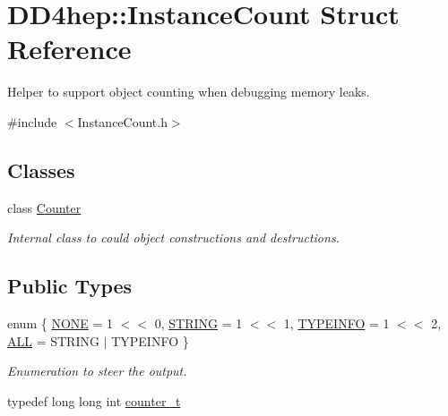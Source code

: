 \hypertarget{struct_d_d4hep_1_1_instance_count}{}\section{D\+D4hep\+:\+:Instance\+Count Struct Reference}
\label{struct_d_d4hep_1_1_instance_count}


Helper to support object counting when debugging memory leaks.  




{\ttfamily \#include $<$Instance\+Count.\+h$>$}

\subsection*{Classes}
\begin{DoxyCompactItemize}
\item 
class \hyperlink{class_d_d4hep_1_1_instance_count_1_1_counter}{Counter}
\begin{DoxyCompactList}\small\item\em Internal class to could object constructions and destructions. \end{DoxyCompactList}\end{DoxyCompactItemize}
\subsection*{Public Types}
\begin{DoxyCompactItemize}
\item 
enum \{ \hyperlink{struct_d_d4hep_1_1_instance_count_ae1ac289e30ac5ae83640ae2ed97f947ca7ef09dfc0136f6756ab56b221b86115a}{N\+O\+NE} = 1 $<$$<$ 0, 
\hyperlink{struct_d_d4hep_1_1_instance_count_ae1ac289e30ac5ae83640ae2ed97f947ca62f53809ed03b36e645549bc7da959d3}{S\+T\+R\+I\+NG} = 1 $<$$<$ 1, 
\hyperlink{struct_d_d4hep_1_1_instance_count_ae1ac289e30ac5ae83640ae2ed97f947ca87ab47dcf03aaa78096e84a187544373}{T\+Y\+P\+E\+I\+N\+FO} = 1 $<$$<$ 2, 
\hyperlink{struct_d_d4hep_1_1_instance_count_ae1ac289e30ac5ae83640ae2ed97f947ca948324c1e49c9a310b45c9f681b381a8}{A\+LL} = S\+T\+R\+I\+NG $\vert$ T\+Y\+P\+E\+I\+N\+FO
 \}\begin{DoxyCompactList}\small\item\em Enumeration to steer the output. \end{DoxyCompactList}
\item 
typedef long long int \hyperlink{struct_d_d4hep_1_1_instance_count_ae81dc0c76b135425e14b6dc38262a727}{counter\+\_\+t}
\end{DoxyCompactItemize}

